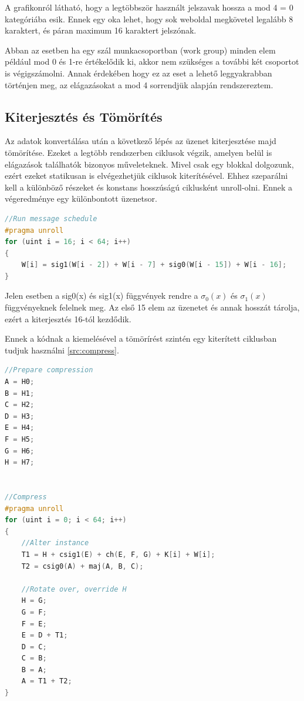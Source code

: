 A grafikonról látható, hogy a legtöbbször használt jelszavak hossza a mod 4 = 0 kategóriába esik. Ennek egy oka lehet, hogy sok weboldal megkövetel legalább 8 karaktert, és páran maximum 16 karaktert jelszónak.

Abban az esetben ha egy szál munkacsoportban (work group) minden elem például mod 0 és 1-re értékelődik ki, akkor nem szükséges a további két csoportot is végigszámolni. Annak érdekében hogy ez az eset a lehető leggyakrabban történjen meg, az elágazásokat a mod 4 sorrendjük alapján rendszereztem.




\subsection{Kiterjesztés és Tömörítés}


Az adatok konvertálása után a következő lépés az üzenet kiterjesztése majd tömörítése. Ezeket a legtöbb rendszerben ciklusok végzik, amelyen belül is elágazások találhatók bizonyos műveleteknek. Mivel csak egy blokkal dolgozunk, ezért ezeket statikusan is elvégezhetjük ciklusok kiterítésével. Ehhez szeparálni kell a különböző részeket és konstans hosszúságú ciklusként unroll-olni. Ennek a végeredménye egy különbontott üzenetsor.

\begin{lstlisting}[language={C++}]
//Run message schedule
#pragma unroll
for (uint i = 16; i < 64; i++)
{
    W[i] = sig1(W[i - 2]) + W[i - 7] + sig0(W[i - 15]) + W[i - 16];
}
\end{lstlisting}


Jelen esetben a sig0(x) és sig1(x) függvények rendre a $\sigma_0(x)$ és $\sigma_1(x)$ függvényeknek felelnek meg. Az első 15 elem az üzenetet és annak hosszát tárolja, ezért a kiterjesztés 16-tól kezdődik.

Ennek a kódnak a kiemelésével a tömörírést szintén egy kiterített ciklusban tudjuk használni \ref{src:compress}.

\begin{lstlisting}[language={C++}]
//Prepare compression
A = H0;
B = H1;
C = H2;
D = H3;
E = H4;
F = H5;
G = H6;
H = H7;


//Compress
#pragma unroll
for (uint i = 0; i < 64; i++)
{
    //Alter instance
    T1 = H + csig1(E) + ch(E, F, G) + K[i] + W[i];
    T2 = csig0(A) + maj(A, B, C);

    //Rotate over, override H
    H = G;
    G = F;
    F = E;
    E = D + T1;
    D = C;
    C = B;
    B = A;
    A = T1 + T2;
}
\end{lstlisting}

